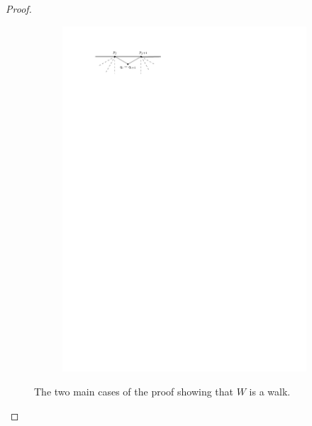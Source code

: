 \begin{proof}
\begin{figure}[b]
\begin{subfigure}[b]{0.5\linewidth}
            \includegraphics[width=\linewidth]{unifiedAlgo/img/walkProofB}
            \vspace{1cm}
            \caption{}
        \end{subfigure}
        \caption{The two main cases of the proof showing that $W$ is a walk.}
        \label{fig:uni:walkproof}
      \end{figure}
    \end{proof}

